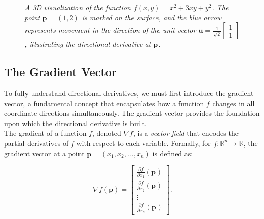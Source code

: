 \begin{figure}[H]
\centering
{}
\caption{\textit{A 3D visualization of the function \( f(x, y) = x^2 + 3xy + y^2 \). The point \( \mathbf{p} = (1, 2) \) is marked on the surface, and the blue arrow represents movement in the direction of the unit vector \( \mathbf{u} = \frac{1}{\sqrt{2}} \begin{bmatrix} 1 \\ 1 \end{bmatrix} \), illustrating the directional derivative at \( \mathbf{p} \).}}
\end{figure}


\subsection*{The Gradient Vector} 

\noindent To fully understand directional derivatives, we must first introduce the gradient vector, a fundamental concept that encapsulates how a function \( f \) changes in all coordinate directions simultaneously. The gradient vector provides the foundation upon which the directional derivative is built. \\

\noindent The gradient of a function \( f \), denoted \( \nabla f \), is a \textit{vector field} that encodes the partial derivatives of \( f \) with respect to each variable. Formally, for \( f: \mathbb{R}^n \to \mathbb{R} \), the gradient vector at a point \( \mathbf{p} = (x_1, x_2, \ldots, x_n) \) is defined as:

\[
\nabla f(\mathbf{p}) = \begin{bmatrix} 
\frac{\partial f}{\partial x_1}(\mathbf{p}) \\[1em] 
\frac{\partial f}{\partial x_2}(\mathbf{p}) \\[1em] 
\vdots \\[1em] 
\frac{\partial f}{\partial x_n}(\mathbf{p}) 
\end{bmatrix}.
\]

